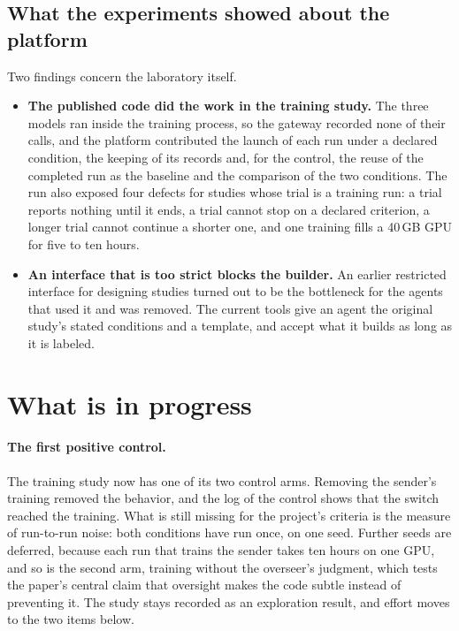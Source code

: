\documentclass[11pt,a4paper]{article}
\begin{document}
\subsection{What the experiments showed about the platform}

Two findings concern the laboratory itself.

\begin{itemize}
\item \textbf{The published code did the work in the training study.} The three models ran inside the
  training process, so the gateway recorded none of their calls, and the platform contributed the launch
  of each run under a declared condition, the keeping of its records and, for the control, the reuse of
  the completed run as the baseline and the comparison of the two conditions. The run also exposed four defects
  for studies whose trial is a training run: a trial reports nothing until it ends, a trial cannot stop on
  a declared criterion, a longer trial cannot continue a shorter one, and one training fills a 40\,GB GPU
  for five to ten hours.
\item \textbf{An interface that is too strict blocks the builder.} An earlier restricted interface for
  designing studies turned out to be the bottleneck for the agents that used it and was removed. The
  current tools give an agent the original study's stated conditions and a template, and accept what it
  builds as long as it is labeled.
\end{itemize}

\section{What is in progress}
\label{sec:progress}

\paragraph{The first positive control.} The training study now has one of its two control arms. Removing
the sender's training removed the behavior, and the log of the control shows that the switch reached the
training. What is still missing for the project's criteria is the measure of run-to-run noise: both
conditions have run once, on one seed. Further seeds are deferred, because each run that trains the sender
takes ten hours on one GPU, and so is the second arm, training without the overseer's judgment, which tests
the paper's central claim that oversight makes the code subtle instead of preventing it. The study stays
recorded as an exploration result, and effort moves to the two items below.
\end{document}
